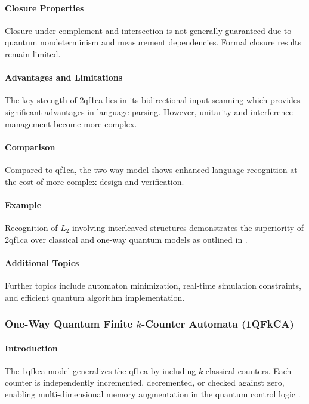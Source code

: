 \paragraph{Closure Properties}
Closure under complement and intersection is not generally guaranteed due to quantum nondeterminism and measurement dependencies. Formal closure results remain limited.

\paragraph{Advantages and Limitations}
The key strength of \gls{2qf1ca} lies in its bidirectional input scanning which provides significant advantages in language parsing. However, unitarity and interference management become more complex.

\paragraph{Comparison}
Compared to \gls{qf1ca}, the two-way model shows enhanced language recognition at the cost of more complex design and verification.

\paragraph{Example}
Recognition of $L_2$ involving interleaved structures demonstrates the superiority of \gls{2qf1ca} over classical and one-way quantum models as outlined in \cite{bonner2001quantum}.

\paragraph{Additional Topics}
Further topics include automaton minimization, real-time simulation constraints, and efficient quantum algorithm implementation.

\subsubsection{One-Way Quantum Finite $k$-Counter Automata (1QFkCA)}

\paragraph{Introduction}
The \gls{1qfkca} model generalizes the \gls{qf1ca} by including $k$ classical counters. Each counter is independently incremented, decremented, or checked against zero, enabling multi-dimensional memory augmentation in the quantum control logic \cite{cem2012quantum}.

